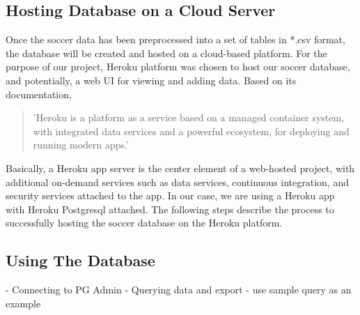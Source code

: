 \subsection{Hosting Database on a Cloud Server}
Once the soccer data has been preprocessed into a set of tables in *.csv format, the database will be created and hosted on a cloud-based platform. For the purpose of our project, Heroku platform was chosen to host our soccer database, and potentially, a web UI for viewing and adding data.
Based on its documentation, \begin{quote}
    'Heroku is a platform as a service based on a managed container system, with integrated data services and a powerful ecosystem, for deploying and running modern apps.' \cite{b10}
\end{quote} Basically, a Heroku app server is the center element of a web-hosted project, with additional on-demand services such as data services, continuous integration, and security services attached to the app. In our case, we are using a Heroku app with Heroku Postgresql attached. The following steps describe  the process to successfully hosting the soccer database on the Heroku platform.

\subsection{Using The Database}
- Connecting to PG Admin 
- Querying data and export
    - use sample query as an example